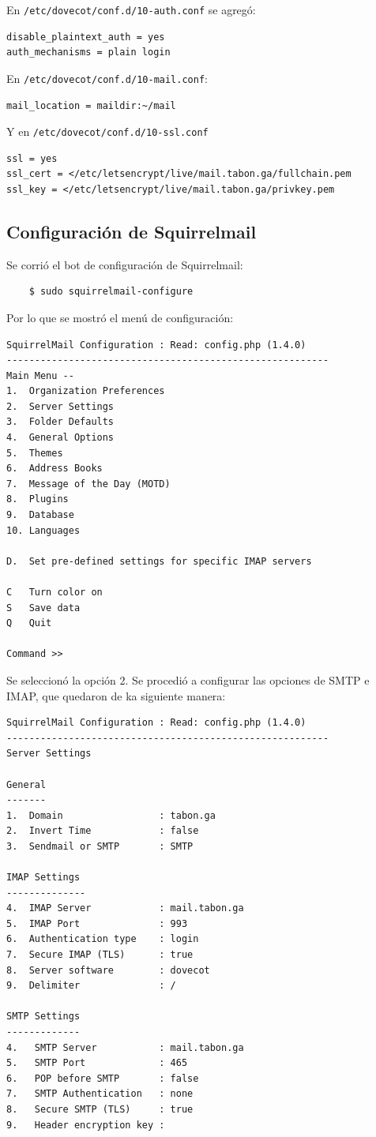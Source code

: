 \documentclass[9pt]{article}
\begin{document}
En \texttt{/etc/dovecot/conf.d/10-auth.conf} se agregó:
\begin{verbatim}
disable_plaintext_auth = yes
auth_mechanisms = plain login
\end{verbatim}

En \texttt{/etc/dovecot/conf.d/10-mail.conf}:
\begin{verbatim}
mail_location = maildir:~/mail
\end{verbatim}

Y en \texttt{/etc/dovecot/conf.d/10-ssl.conf}
\begin{verbatim}
ssl = yes
ssl_cert = </etc/letsencrypt/live/mail.tabon.ga/fullchain.pem
ssl_key = </etc/letsencrypt/live/mail.tabon.ga/privkey.pem
\end{verbatim}

\subsection{Configuración de Squirrelmail}
Se corrió el bot de configuración de Squirrelmail:
\begin{verbatim}
    $ sudo squirrelmail-configure
\end{verbatim}

Por lo que se mostró el menú de configuración:

\begin{verbatim}
SquirrelMail Configuration : Read: config.php (1.4.0)
---------------------------------------------------------
Main Menu --
1.  Organization Preferences
2.  Server Settings
3.  Folder Defaults
4.  General Options
5.  Themes
6.  Address Books
7.  Message of the Day (MOTD)
8.  Plugins
9.  Database
10. Languages

D.  Set pre-defined settings for specific IMAP servers

C   Turn color on
S   Save data
Q   Quit

Command >> 
\end{verbatim}

Se seleccionó la opción 2. Se procedió a configurar las opciones de SMTP e IMAP, que quedaron de ka siguiente manera:

\begin{verbatim}
SquirrelMail Configuration : Read: config.php (1.4.0)
---------------------------------------------------------
Server Settings

General
-------
1.  Domain                 : tabon.ga
2.  Invert Time            : false
3.  Sendmail or SMTP       : SMTP

IMAP Settings
--------------
4.  IMAP Server            : mail.tabon.ga
5.  IMAP Port              : 993
6.  Authentication type    : login
7.  Secure IMAP (TLS)      : true
8.  Server software        : dovecot
9.  Delimiter              : /

SMTP Settings
-------------
4.   SMTP Server           : mail.tabon.ga
5.   SMTP Port             : 465
6.   POP before SMTP       : false
7.   SMTP Authentication   : none
8.   Secure SMTP (TLS)     : true
9.   Header encryption key : 
\end{verbatim}
\end{document}
